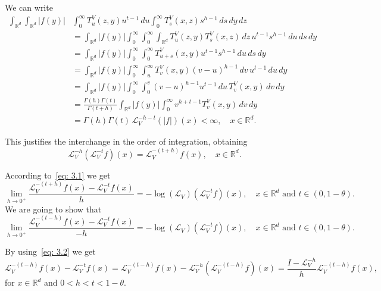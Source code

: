 \documentclass[10pt, a4paper, reqno]{amsart}
\theoremstyle{definition}
\theoremstyle{remark}
\numberwithin{equation}{section}
\begin{document}
We can write
\begin{equation*}
    \begin{split}
        \int_{\mathbb{R}^d} \int_{\mathbb{R}^d} |f(y)| & \int_{0}^\infty T_u^V(z,y) u^{t-1} \, du \int_0^{\infty} T_s^V(x,z) s^{h-1} \, ds \, dy \, dz \\
        & = \int_{\mathbb{R}^d} |f(y)| \int_{0}^\infty \int_0^{\infty} \int_{\mathbb{R}^d} T_u^V(z,y) T_s^V(x,z) \, dz \, u^{t-1} s^{h-1} \, du \, ds \, dy \\
        & = \int_{\mathbb{R}^d} |f(y)| \int_{0}^\infty \int_0^{\infty} T_{u+s}^V(x,y) u^{t-1} s^{h-1} \, du \, ds \, dy \\
        & = \int_{\mathbb{R}^d} |f(y)| \int_{0}^\infty \int_u^{\infty} T_{v}^V(x,y) (v-u)^{h-1} \, dv \, u^{t-1} \, du \, dy \\
        & = \int_{\mathbb{R}^d} |f(y)| \int_{0}^\infty \int_0^{v} (v-u)^{h-1} u^{t-1} \, du \, T_{v}^V(x,y) \, dv \, dy \\
        & = \frac{\Gamma(h)\Gamma(t)}{\Gamma(t+h)} \int_{\mathbb{R}^d} |f(y)| \int_{0}^\infty v^{h+t-1} T_{v}^V(x,y) \, dv \, dy \\
        & = \Gamma(h)\Gamma(t) \, \mathcal{L}_V^{-h-t}(|f|)(x) < \infty, \quad x \in \mathbb{R}^d.
    \end{split}
\end{equation*}

This justifies the interchange in the order of integration, obtaining 
\begin{equation}\label{eq: 3.2}
    \mathcal{L}_V^{-h}(\mathcal{L}_V^{-t} f)(x) = \mathcal{L}_V^{-(t+h)} f(x), \quad x \in \mathbb{R}^d.
\end{equation}

According to~\eqref{eq: 3.1} we get
\begin{equation*}
    \lim_{h \rightarrow 0^+} \frac{\mathcal{L}_V^{-(t+h)} f(x) - \mathcal{L}_V^{-t} f(x)}{h} = -\log(\mathcal{L}_V) (\mathcal{L}_V^{-t} f)(x), \quad x \in \mathbb{R}^d \text{ and } t \in (0, 1-\theta).
\end{equation*}
We are going to show that
\begin{equation}\label{eq: 3.3}
    \lim_{h \rightarrow 0^+} \frac{\mathcal{L}_V^{-(t-h)} f(x) - \mathcal{L}_V^{-t} f(x)}{-h} = -\log(\mathcal{L}_V) (\mathcal{L}_V^{-t} f)(x), \quad x \in \mathbb{R}^d \text{ and } t \in (0, 1-\theta).
\end{equation}

By using~\eqref{eq: 3.2} we get
\begin{equation*}
    \mathcal{L}_V^{-(t-h)} f(x) - \mathcal{L}_V^{-t} f(x) = \mathcal{L}_V^{-(t-h)} f(x) - \mathcal{L}_V^{-h} (\mathcal{L}_V^{-(t-h)} f)(x) = \frac{I - \mathcal{L}_V^{-h}}{h} \mathcal{L}_V^{-(t-h)} f(x),
\end{equation*}
for $x \in \mathbb{R}^d$ and $0 < h < t < 1-\theta$. 
\end{document}

